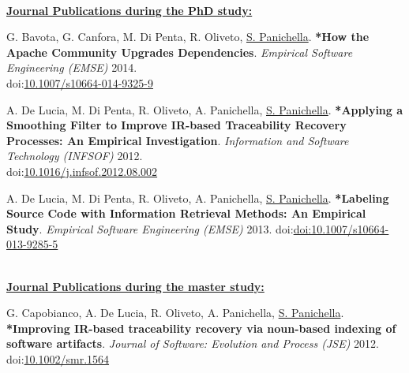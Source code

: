 \documentclass[10pt]{article}
\renewcommand{\section}[1]{\pagebreak[3]%
    \vspace{1.3\baselineskip}%
    \phantomsection\addcontentsline{toc}{section}{#1}%
    \noindent\llap{\scshape\smash{\parbox[t]{\marginparwidth}{\hyphenpenalty=10000\raggedright #1}}}%
    \vspace{-\baselineskip}\par}
\newcommand\doilink[1]{\href{http://dx.doi.org/#1}{#1}}
\newcommand\doi[1]{doi:\doilink{#1}}
\begin{document}
  \textbf{\\\underline{Journal Publications during the PhD study:}}\\
  \begin{bibenum}
    \item \label{J2} G. Bavota, G. Canfora, M. Di Penta, R. Oliveto, \underline{S. Panichella}. \textbf{*How the Apache Community Upgrades Dependencies}. \emph{Empirical Software Engineering (EMSE)} 2014.\\
             \doi{10.1007/s10664-014-9325-9}
             
    \item \label{J3}  A. De Lucia, M. Di Penta, R. Oliveto, A. Panichella, \underline{S. Panichella}. \textbf{*Applying a Smoothing Filter to Improve IR-based Traceability Recovery Processes: An Empirical Investigation}. \emph{Information and Software Technology (INFSOF)} 2012.\\
        \doi{10.1016/j.infsof.2012.08.002}

    \item \label{J5} A. De Lucia, M. Di Penta, R. Oliveto, A. Panichella, \underline{S. Panichella}. \textbf{*Labeling Source Code with Information Retrieval Methods: An Empirical Study}. \emph{Empirical Software Engineering (EMSE)} 2013.
                \doi{doi:10.1007/s10664-013-9285-5}
\end{bibenum} 

  \textbf{\\\underline{Journal Publications during the master study:}}\\
\begin{bibenum}
    \item \label{J4}  G. Capobianco, A. De Lucia, R. Oliveto, A. Panichella, \underline{S. Panichella}. \textbf{*Improving IR-based traceability recovery via noun-based indexing of software artifacts}. \emph{Journal of Software: Evolution and Process (JSE)} 2012.\\
        \doi{10.1002/smr.1564}
\end{bibenum} 
\end{document}
